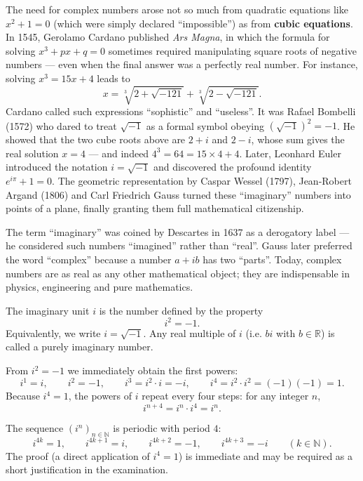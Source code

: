 \documentclass[11pt]{article}
\newcommand{\cle}[1]{{\popxbold\color{popdark}#1}}
\newcounter{popsec}
\newcounter{popsub}
\newcommand{\courssub}[1]{%
  \stepcounter{popsub}%
  \par\vspace{9pt}\noindent{\popxbold\fontsize{11.5}{13}\selectfont\color{popink}{\color{poporange}\thepopsec.\thepopsub}\hspace{6pt}#1}\par\nopagebreak\vspace{4pt}
}
\begin{document}
The need for complex numbers arose not so much from quadratic equations like $x^{2}+1=0$ (which were simply declared ``impossible'') as from \textbf{cubic equations}. In 1545, Gerolamo Cardano published \emph{Ars Magna}, in which the formula for solving $x^{3}+px+q=0$ sometimes required manipulating square roots of negative numbers — even when the final answer was a perfectly real number. For instance, solving $x^{3}=15x+4$ leads to
\[
x=\sqrt[3]{2+\sqrt{-121}}+\sqrt[3]{2-\sqrt{-121}}.
\]
Cardano called such expressions ``sophistic'' and ``useless''. It was Rafael Bombelli (1572) who dared to treat $\sqrt{-1}$ as a formal symbol obeying $(\sqrt{-1})^{2}=-1$. He showed that the two cube roots above are $2+i$ and $2-i$, whose sum gives the real solution $x=4$ — and indeed $4^{3}=64=15\times 4+4$. Later, Leonhard Euler introduced the notation $i=\sqrt{-1}$ and discovered the profound identity $e^{i\pi}+1=0$. The geometric representation by Caspar Wessel (1797), Jean-Robert Argand (1806) and Carl Friedrich Gauss turned these ``imaginary'' numbers into points of a plane, finally granting them full mathematical citizenship.

\begin{savaistu}
The term ``imaginary'' was coined by Descartes in 1637 as a derogatory label — he considered such numbers ``imagined'' rather than ``real''. Gauss later preferred the word ``complex'' because a number $a+ib$ has two ``parts''. Today, complex numbers are as real as any other mathematical object; they are indispensable in physics, engineering and pure mathematics.
\end{savaistu}

\courssub{The Imaginary Unit $i$ and its Algebra}

\begin{definition}
The \cle{imaginary unit} $i$ is the number defined by the property
\[
i^{2}=-1.
\]
Equivalently, we write $i=\sqrt{-1}$. Any real multiple of $i$ (i.e. $bi$ with $b\in\mathbb{R}$) is called a \cle{purely imaginary number}.
\end{definition}

From $i^{2}=-1$ we immediately obtain the first powers:
\[
i^{1}=i,\qquad i^{2}=-1,\qquad i^{3}=i^{2}\cdot i=-i,\qquad i^{4}=i^{2}\cdot i^{2}=(-1)(-1)=1.
\]
Because $i^{4}=1$, the powers of $i$ repeat every four steps: for any integer $n$,
\[
i^{n+4}=i^{n}\cdot i^{4}=i^{n}.
\]

\begin{propriete}
The sequence $(i^{n})_{n\in\mathbb{N}}$ is periodic with period $4$:
\[
i^{4k}=1,\qquad i^{4k+1}=i,\qquad i^{4k+2}=-1,\qquad i^{4k+3}=-i\qquad(k\in\mathbb{N}).
\]
The proof (a direct application of $i^{4}=1$) is immediate and may be required as a short justification in the examination.
\end{propriete}
\end{document}
